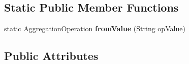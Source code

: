 \subsection*{Static Public Member Functions}
\begin{DoxyCompactItemize}
\item 
\mbox{\label{enumeu_1_1h2020_1_1symbiote_1_1cloud_1_1monitoring_1_1model_1_1AggregationOperation_a03b960fc436ca56a0d53dad9cf83f8e1}} 
static \hyperlink{enumeu_1_1h2020_1_1symbiote_1_1cloud_1_1monitoring_1_1model_1_1AggregationOperation}{Aggregation\+Operation} {\bfseries from\+Value} (String op\+Value)
\end{DoxyCompactItemize}
\subsection*{Public Attributes}
